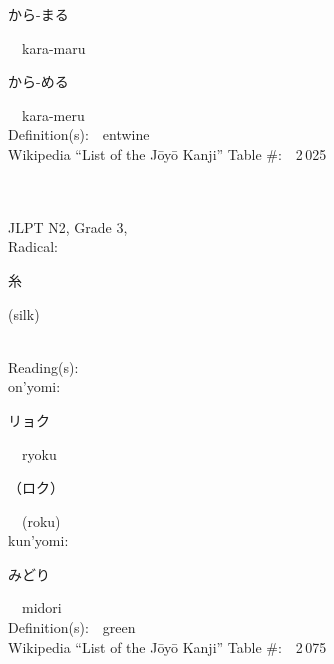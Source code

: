 \begin{multicols}{2}
{\hspace*{2em}}{\begin{CJK}{UTF8}{min} から-まる \end{CJK}}\ \ kara-maru\ \ \\
{\hspace*{2em}}{\begin{CJK}{UTF8}{min} から-める \end{CJK}}\ \ kara-meru\ \ \\
Definition(s):\ \ entwine \\
Wikipedia ``List of the J\=oy\=o Kanji'' Table \#:\ \ 2\,025 \\
\ \ \\
{\fontsize{34pt}{40pt}  }\ \ \\  %
{JLPT N2, Grade 3, \\Radical:\ \ {\begin{CJK}{UTF8}{min} 糸 \end{CJK}} (silk) } \\
Reading(s):\ \ \\
{\hspace*{1em}}on'yomi:\ \ \\
{\hspace*{2em}}{\begin{CJK}{UTF8}{min} リョク \end{CJK}}\ \ ryoku\ \ \\
{\hspace*{2em}}{\begin{CJK}{UTF8}{min} （ロク） \end{CJK}}\ \ (roku)\ \ \\
{\hspace*{1em}}kun'yomi:\ \ \\
{\hspace*{2em}}{\begin{CJK}{UTF8}{min} みどり \end{CJK}}\ \ midori\ \ \\
Definition(s):\ \ green \\
Wikipedia ``List of the J\=oy\=o Kanji'' Table \#:\ \ 2\,075 \\
\ \ \\
{\fontsize{34pt}{40pt}  }\ \ \\  %

\end{multicols}
